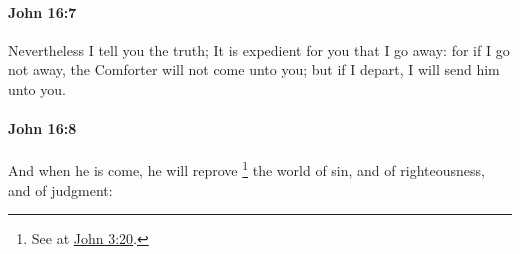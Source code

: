		\paragraph{John 16:7} %
			\label{JOHN-16-7}

			Nevertheless I tell you the truth; It is expedient for you that I go away: for if I go not away, the Comforter will not come unto you; but if I depart, I will send him unto you.

			\begin{framed}
				\scriptsize
				\begin{compactdesc}
					\item[SBLG] 
				\end{compactdesc}
			\end{framed}

		\paragraph{John 16:8} %
			\label{JOHN-16-8}

			And when he is come, he will reprove%
				\footnote{%
					See \hyperref[ELENCHO]{} at \hyperref[JOHN-3-20]{John 3:20}.
					}
			the world of sin, and of righteousness, and of judgment:

